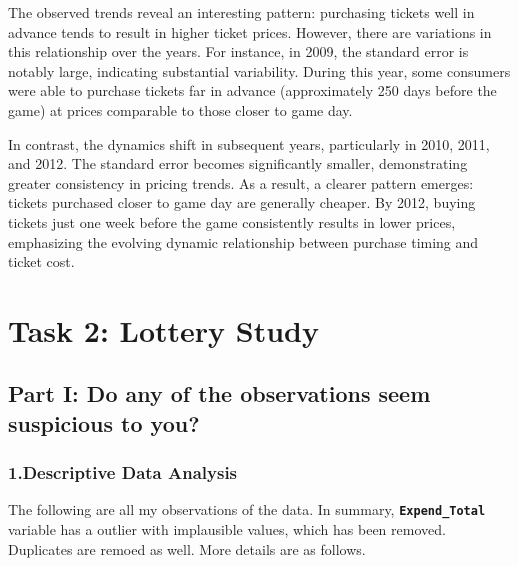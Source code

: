 \documentclass[
  12pt]{article}
\begin{document}
The observed trends reveal an interesting pattern: purchasing tickets
well in advance tends to result in higher ticket prices. However, there
are variations in this relationship over the years. For instance, in
2009, the standard error is notably large, indicating substantial
variability. During this year, some consumers were able to purchase
tickets far in advance (approximately 250 days before the game) at
prices comparable to those closer to game day.

In contrast, the dynamics shift in subsequent years, particularly in
2010, 2011, and 2012. The standard error becomes significantly smaller,
demonstrating greater consistency in pricing trends. As a result, a
clearer pattern emerges: tickets purchased closer to game day are
generally cheaper. By 2012, buying tickets just one week before the game
consistently results in lower prices, emphasizing the evolving dynamic
relationship between purchase timing and ticket cost.

\section{Task 2: Lottery Study}\label{task-2-lottery-study}

\subsection{Part I: Do any of the observations seem suspicious to
you?}\label{part-i-do-any-of-the-observations-seem-suspicious-to-you}

\subsubsection{1.Descriptive Data
Analysis}\label{descriptive-data-analysis}

The following are all my observations of the data. In summary,
\textbf{\texttt{Expend\_Total}} variable has a outlier with implausible
values, which has been removed. Duplicates are remoed as well. More
details are as follows.
\end{document}
